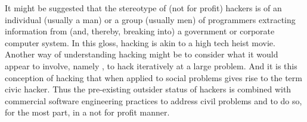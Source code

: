 It might be suggested that the stereotype of (not for profit) hackers is of an individual (usually a man) or a group (usually men) of programmers extracting information from (and, thereby, breaking into) a government or corporate computer system. In this gloss, hacking is akin to a high tech heist movie. Another way of understanding hacking might be to consider what it would appear to involve, namely , to hack iteratively at a large problem. And it is this conception of hacking that when applied to social problems gives rise to the term civic hacker. Thus the pre-existing outsider status of hackers is combined with commercial software engineering practices to address civil problems and to do so, for the most part, in a not for profit manner.